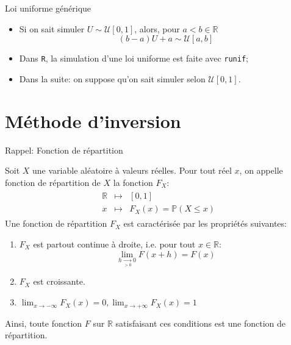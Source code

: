 \documentclass[ignorenonframetext,]{beamer}
\providecommand{\tightlist}{%
  \setlength{\itemsep}{0pt}\setlength{\parskip}{0pt}}
\newcommand{\R}{\mathbb{R}}
\begin{document}
\begin{frame}[fragile]{Loi uniforme générique}
\protect\hypertarget{loi-uniforme-guxe9nuxe9rique}{}

\begin{itemize}
\tightlist
\item
  Si on sait simuler \(U\sim \mathcal{U}[0, 1]\), alors, pour
  \(a < b \in \mathbb{R}\) \[(b - a) U + a \sim \mathcal{U}[a, b]\]
\item
  Dans \texttt{R}, la simulation d'une loi uniforme est faite avec
  \texttt{runif};
\item
  Dans la suite: on suppose qu'on sait simuler selon
  \(\mathcal{U}[0, 1]\).
\end{itemize}

\end{frame}

\hypertarget{muxe9thode-dinversion}{%
\section{Méthode d'inversion}\label{muxe9thode-dinversion}}

\begin{frame}{Rappel: Fonction de répartition}
\protect\hypertarget{rappel-fonction-de-ruxe9partition}{}

Soit \(X\) une variable aléatoire à valeurs réelles. Pour tout réel
\(x\), on appelle fonction de répartition de \(X\) la fonction \(F_X\):
\begin{align*}
\begin{array}{ccl}
\R &\mapsto& [0, 1]\\
x &\mapsto& F_X(x) = \mathbb{P}(X \leq x)
\end{array}
\end{align*}\pause Une fonction de répartition \(F_X\) est caractérisée
par les propriétés suivantes:

\begin{enumerate}
\item $F_X$ est partout continue à droite, i.e. pour tout $x\in \R$: $$\lim_{h \underset{>0}{\rightarrow} 0} F(x + h) = F(x)$$
\item $F_X$ est croissante.
\item $\lim_{x \rightarrow -\infty}F_X(x) = 0, \lim_{x \rightarrow +\infty}F_X(x) = 1$
\end{enumerate}

Ainsi, toute fonction \(F\) sur \(\R\) satisfaisant ces conditions est
une fonction de répartition.

\end{frame}
\end{document}
